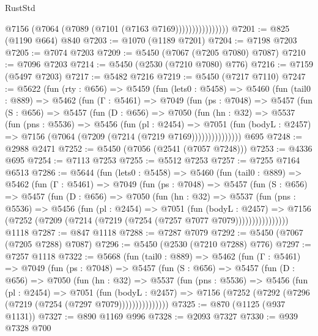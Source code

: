 \begin{lexlean}{RustStd}
\begin{coremodule}
                          @7156 (@7064 (@7089 (@7101 (@7163 @7169))))))))))))))))
@7201 := @825 (@1190 @664) @840
@7203 := @1070 (@1189 @7201)
@7204 := @7198 @7203
@7205 := @7074 @7203
@7209 := @5450 (@7067 (@7205 @7080) @7087)
@7210 := @7096 @7203
@7214 := @5450 (@2530 (@7210 @7080) @776)
@7216 := @7159 (@5497 @7203)
@7217 := @5482 @7216
@7219 := @5450 (@7217 @7110)
@7247 := @5622
    (fun (rty : @656) =>
    @5459
      (fun (lets0 : @5458) =>
      @5460
        (fun (tail0 : @889) =>
        @5462
          (fun (Γ : @5461) =>
          @7049
            (fun (ps : @7048) =>
            @5457
              (fun (S : @656) =>
              @5457
                (fun (D : @656) =>
                @7050
                  (fun (hn : @32) =>
                  @5537
                    (fun (pns : @5536) =>
                    @5456
                      (fun (pl : @2454) =>
                      @7051
                        (fun (bodyL : @2457) =>
                        @7156 (@7064 (@7209 (@7214 (@7219 @7169)))))))))))))))
    @695
@7248 := @2988 @2471
@7252 := @5450 (@7056 (@2541 (@7057 @7248)))
@7253 := @4336 @695
@7254 := @7113 @7253
@7255 := @5512 @7253
@7257 := @7255 @7164 @6513
@7286 := @5644
    (fun (lets0 : @5458) =>
    @5460
      (fun (tail0 : @889) =>
      @5462
        (fun (Γ : @5461) =>
        @7049
          (fun (ps : @7048) =>
          @5457
            (fun (S : @656) =>
            @5457
              (fun (D : @656) =>
              @7050
                (fun (hn : @32) =>
                @5537
                  (fun (pns : @5536) =>
                  @5456
                    (fun (pl : @2454) =>
                    @7051
                      (fun (bodyL : @2457) =>
                      @7156 (@7252 (@7209 (@7214 (@7219 (@7254 (@7257 @7077 @7079))))))))))))))))
    @1118
@7287 := @847 @1118
@7288 := @7287 @7079
@7292 := @5450 (@7067 (@7205 @7288) @7087)
@7296 := @5450 (@2530 (@7210 @7288) @776)
@7297 := @7257 @1118
@7322 := @5668
    (fun (tail0 : @889) =>
    @5462
      (fun (Γ : @5461) =>
      @7049
        (fun (ps : @7048) =>
        @5457
          (fun (S : @656) =>
          @5457
            (fun (D : @656) =>
            @7050
              (fun (hn : @32) =>
              @5537
                (fun (pns : @5536) =>
                @5456
                  (fun (pl : @2454) =>
                  @7051
                    (fun (bodyL : @2457) =>
                    @7156 (@7252 (@7292 (@7296 (@7219 (@7254 (@7297 @7079)))))))))))))))
@7325 := @870 (@1125 (@937 @1131))
@7327 := @890 @1169 @996
@7328 := @2093 @7327
@7330 := @939 @7328 @700

\end{coremodule}
\end{lexlean}
